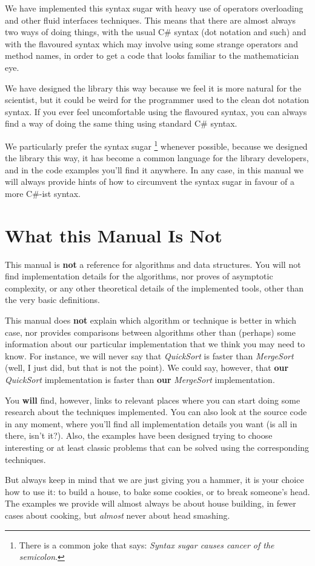 We have implemented this syntax sugar with heavy use of operators
overloading and other fluid interfaces techniques. This means 
that there are almost always two ways of doing things, with
the usual C\# syntax (dot notation and such) and with the flavoured
syntax which may involve using some strange operators and 
method names, in order to get a code that looks familiar
to the mathematician eye. 

We have designed the library this way because we feel it is
more natural for the scientist, but it could be weird for the
programmer used to the clean dot notation syntax. If you ever
feel uncomfortable using the flavoured syntax, you can
always find a way of doing the same thing using standard
C\# syntax. 

We particularly prefer the syntax sugar
\footnote{There is a common joke that says: \emph{Syntax sugar
causes cancer of the semicolon}.} whenever possible, because
we designed the library this way, it has become a
common language for the library developers, and in the code examples
you'll find it anywhere. In any case, in this manual we will
always provide hints of how to circumvent the syntax sugar
in favour of a more C\#-ist syntax.

\section*{What this Manual Is Not}

This manual is \textbf{not} a reference for algorithms and
data structures. You will not find implementation details for the
algorithms, nor proves of asymptotic complexity, or any other
theoretical details of the implemented tools, other than the very
basic definitions.

This manual does \textbf{not} explain which algorithm or technique
is better in which case, nor provides comparisons between algorithms 
other than (perhaps) some information about our particular implementation
that we think you may need to know. For instance, we will never say
that \emph{QuickSort} is faster than \emph{MergeSort} (well, I just did, but
that is not the point). We could say, however, that \textbf{our} \emph{QuickSort}
implementation is faster than \textbf{our} \emph{MergeSort} implementation.

You \textbf{will} find, however, links to
relevant places where you can start doing some research
about the techniques implemented. You can also look at the
source code in any moment, where you'll find all implementation
details you want (is all in there, isn't it?). Also, the
examples have been designed trying to choose interesting or at least
classic problems that can be solved using the corresponding
techniques. 

But always keep in mind that we are just giving you
a hammer, it is your choice how to use it: to build a house,
to bake some cookies, or to break someone's head. The examples
we provide will almost always be about house building, in fewer
cases about cooking, but \emph{almost} never about head smashing. 